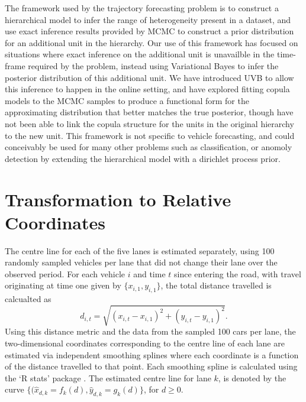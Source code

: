 \documentclass[12pt,a4paper]{article}\usepackage[]{graphicx}\usepackage[]{color}
\begin{document}
The framework used by the trajectory forecasting problem is to construct a hierarchical model to infer the range of heterogeneity present in a dataset, and use exact inference results provided by MCMC to construct a prior distribution for an additional unit in the hierarchy. Our use of this framework has focused on situations where exact inference on the additional unit is unavailble in the time-frame required by the problem, instead using Variational Bayes to infer the posterior distribution of this additional unit. We have introduced UVB to allow this inference to happen in the online setting, and have explored fitting copula models to the MCMC samples to produce a functional form for the approximating distribution that better matches the true posterior, though have not been able to link the copula structure for the units in the original hierarchy to the new unit.
This framework is not specific to vehicle forecasting, and could conceivably be used for many other problems such as classification, or anomoly detection by extending the hierarchical model with a dirichlet process prior.
\\



\newpage



\appendix
\section{Transformation to Relative Coordinates}

The centre line for each of the five lanes is estimated separately, using 100 randomly sampled vehicles per lane that did not change their lane over the observed period. 
For each vehicle $i$ and time $t$ since entering the road, with travel originating at time one given by $\{x_{i,1}, y_{i,1}\}$, the total distance travelled is calcualted as 
\begin{equation}
\label{distance}
d_{i, t} = \sqrt{(x_{i, t} - x_{i, 1})^2 + (y_{i, t} - y_{i, 1})^2}.
\end{equation}
Using this distance metric and the data from the sampled 100 cars per lane, the two-dimensional coordinates corresponding to the centre line of each lane are estimated via independent smoothing splines where each coordinate is a function of the distance travelled to that point. Each smoothing spline is calculated using the `R stats' package \citep{R}. The estimated centre line for lane $k$, is denoted by the curve $\{(\hat{x}_{d,k} = f_k(d), \hat{y}_{d,k} = g_k(d)\}$, for $d \geq 0$.
\\
\end{document}
